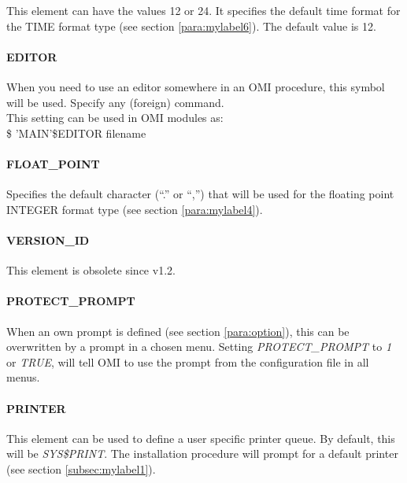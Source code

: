 \documentclass[a4paper]{book}
\renewcommand{\indent}{\hspace*{5mm}}
\begin{document}
This element can have the values 12 or 24. It specifies the default time 
format for the TIME format type (see section \ref{para:mylabel6}). The
default value is 12.

\paragraph{EDITOR}
\label{para:editorlement}

When you need to use an editor somewhere in an OMI procedure, this symbol 
will be used. Specify any (foreign) command. \\
This setting can be used in OMI modules as: \\
\indent\textsf{{\$} 'MAIN'{\$}EDITOR filename}

\paragraph{FLOAT{\_}POINT}
\label{para:float}

Specifies the default character (``.'' or ``,'') that will be used for the 
floating point INTEGER format type (see section \ref{para:mylabel4}).

\paragraph*{VERSION{\_}ID}

This element is obsolete since v1.2.

\paragraph{PROTECT{\_}PROMPT}
\label{para:protect}

When an own prompt is defined (see section \ref{para:option}),
this can be overwritten by a prompt in a chosen menu. Setting 
\linebreak\textsl{PROTECT{\_}PROMPT} to \textsl{1} or \textsl{TRUE}, will tell OMI to use the prompt from 
the configuration file in all menus.

\paragraph{PRINTER}

This element can be used to define a user specific printer queue. By 
default, this will be \textsl{SYS{\$}PRINT}. The installation procedure will prompt 
for a default printer (see section \ref{subsec:mylabel1}).
\end{document}

